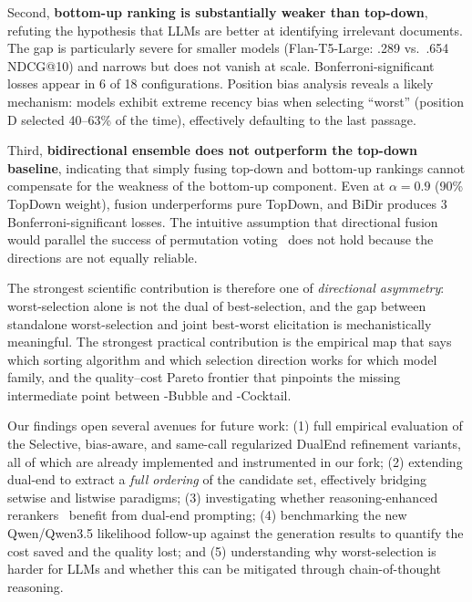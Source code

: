 Second, \textbf{bottom-up ranking is substantially weaker than top-down}, refuting the hypothesis that LLMs are better at identifying irrelevant documents. The gap is particularly severe for smaller models (Flan-T5-Large: .289 vs.\ .654 NDCG@10) and narrows but does not vanish at scale. Bonferroni-significant losses appear in 6 of 18 configurations. Position bias analysis reveals a likely mechanism: models exhibit extreme recency bias when selecting ``worst'' (position D selected 40--63\% of the time), effectively defaulting to the last passage.

Third, \textbf{bidirectional ensemble does not outperform the top-down baseline}, indicating that simply fusing top-down and bottom-up rankings cannot compensate for the weakness of the bottom-up component. Even at $\alpha=0.9$ (90\% TopDown weight), fusion underperforms pure TopDown, and BiDir produces 3 Bonferroni-significant losses. The intuitive assumption that directional fusion would parallel the success of permutation voting~\citep{tang2024found} does not hold because the directions are not equally reliable.

The strongest scientific contribution is therefore one of \emph{directional asymmetry}: worst-selection alone is not the dual of best-selection, and the gap between standalone worst-selection and joint best-worst elicitation is mechanistically meaningful. The strongest practical contribution is the empirical map that says which sorting algorithm and which selection direction works for which model family, and the quality--cost Pareto frontier that pinpoints the missing intermediate point between \topdown{}-Bubble and \dualend{}-Cocktail.

Our findings open several avenues for future work: (1) full empirical evaluation of the Selective, bias-aware, and same-call regularized DualEnd refinement variants, all of which are already implemented and instrumented in our fork; (2) extending dual-end to extract a \emph{full ordering} of the candidate set, effectively bridging setwise and listwise paradigms; (3) investigating whether reasoning-enhanced rerankers~\citep{zhuang2025rankr1} benefit from dual-end prompting; (4) benchmarking the new Qwen/Qwen3.5 likelihood follow-up against the generation results to quantify the cost saved and the quality lost; and (5) understanding why worst-selection is harder for LLMs and whether this can be mitigated through chain-of-thought reasoning.
